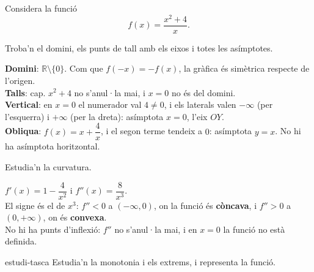 Considera la funció
\[
f(x)=\frac{x^2+4}{x} .
\]

\begin{apartats}

Troba'n el domini, els punts de tall amb els eixos i totes les asímptotes.

\begin{solucio}
\textbf{Domini}: $\mathbb{R}\setminus\{0\}$. Com que $f(-x)=-f(x)$, la gràfica és simètrica respecte
de l'origen.\\
\textbf{Talls}: cap. $x^2+4$ no s'anul·la mai, i $x=0$ no és del domini.\\
\textbf{Vertical}: en $x=0$ el numerador val $4\neq0$, i els laterals valen $-\infty$ (per l'esquerra)
i $+\infty$ (per la dreta): asímptota $\boxed{x=0}$, l'eix $OY$.\\
\textbf{Obliqua}: $f(x)=x+\dfrac4x$, i el segon terme tendeix a $0$: asímptota $\boxed{y=x}$. No hi ha
asímptota horitzontal.
\end{solucio}

\begin{nomesllarg}
Estudia'n la curvatura.

\begin{solucio}
$f'(x)=1-\dfrac{4}{x^2}$ i $f''(x)=\dfrac{8}{x^3}$.\\
El signe és el de $x^3$: $f''<0$ a $(-\infty,0)$, on la funció és \textbf{còncava}, i $f''>0$ a
$(0,+\infty)$, on és \textbf{convexa}.\\
No hi ha punts d'inflexió: $f''$ no s'anul·la mai, i en $x=0$ la funció no està definida.
\end{solucio}
\end{nomesllarg}

\begin{tria}{estudi-tasca}
Estudia'n la monotonia i els extrems, i representa la funció.


\end{tria}
\end{apartats}
